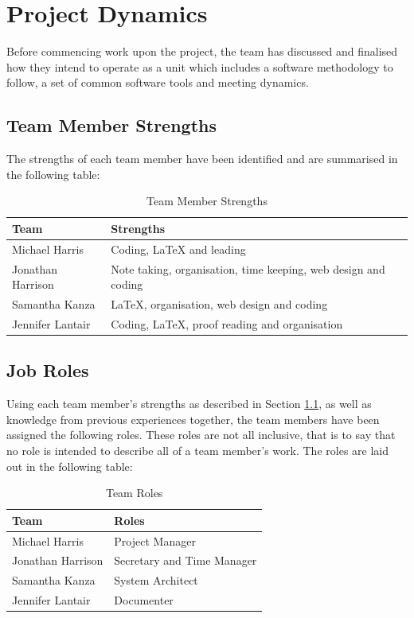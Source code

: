 \section{Project Dynamics}

Before commencing work upon the project, the team has discussed and finalised how they intend to operate as a unit which includes a software methodology to follow, a set of common software tools and meeting dynamics.

\subsection{Team Member Strengths}
\label{sec:TeamStrengths}
The strengths of each team member have been identified and are summarised in the following table:

\begin{table}[ht]
\centering
\begin{tabular}{l | l}
Team & Strengths \\\hline
Michael Harris & Coding, LaTeX and leading \\
Jonathan Harrison & Note taking, organisation, time keeping, web design and coding  \\
Samantha Kanza & LaTeX, organisation, web design and coding  \\
Jennifer Lantair & Coding, LaTeX, proof reading and organisation  \\
\end{tabular}
\caption{Team Member Strengths}
\end{table}
\label{tab:TeamStrengths} 

\subsection{Job Roles}
Using each team member's strengths as described in Section \ref{sec:TeamStrengths}, as well as knowledge from previous experiences together, the team members have been assigned the following roles. These roles are not all inclusive, that is to say that no role is intended to describe all of a team member's work. The roles are laid out in the following table:

\begin{table}[ht]
\centering
\begin{tabular}{l | l}
Team & Roles\\\hline
Michael Harris & Project Manager \\
Jonathan Harrison & Secretary and Time Manager \\
Samantha Kanza & System Architect  \\
Jennifer Lantair & Documenter  \\
\end{tabular}
\caption{Team Roles}
\end{table}
\label{tab:TeamRoles} 

